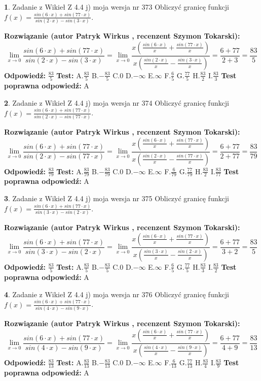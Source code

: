 \documentclass[12pt, a4paper]{article}
\theoremstyle{definition} %
\newtheorem{zad}{}
\newcommand{\zadStart}[1]{\begin{zad}#1\newline}
\newcommand{\zadStop}{\end{zad}}
\newcommand{\rozwStart}[2]{\noindent \textbf{Rozwiązanie (autor #1 , recenzent #2): }\newline}
\newcommand{\rozwStop}{\newline}
\newcommand{\odpStart}{\noindent \textbf{Odpowiedź:}\newline}
\newcommand{\odpStop}{\newline}
\newcommand{\testStart}{\noindent \textbf{Test:}\newline}
\newcommand{\testStop}{\newline}
\newcommand{\kluczStart}{\noindent \textbf{Test poprawna odpowiedź:}\newline}
\newcommand{\kluczStop}{\newline}
\begin{document}
\zadStart{Zadanie z Wikieł Z 4.4 j) moja wersja nr 373}
Obliczyć granicę funkcji $f(x)=\frac{sin(6\cdot x) +sin(77\cdot x)}{sin(2\cdot x) -sin(3\cdot x)}$.
\zadStop
\rozwStart{Patryk Wirkus}{Szymon Tokarski}
$$\lim\limits_{x\to 0}\frac{sin(6\cdot x) +sin(77\cdot x)}{sin(2\cdot x) -sin(3\cdot x)}=\lim\limits_{x\to 0}\frac{x(\frac{sin(6\cdot x)}{x}+\frac{sin(77\cdot x)}{x})}{x(\frac{sin(2\cdot x)}{x}-\frac{sin(3\cdot x)}{x})}=\frac{6+77}{2+3} = \frac{83}{5}$$
\rozwStop
\odpStart
$\frac{83}{5}$
\odpStop
\testStart
A.$\frac{83}{5}$
B.$-\frac{83}{5}$
C.$0$
D.$-\infty$
E.$\infty$
F.$\frac{6}{5}$
G.$\frac{77}{5}$
H.$\frac{83}{2}$
I.$\frac{83}{3}$
\testStop
\kluczStart
A
\kluczStop



\zadStart{Zadanie z Wikieł Z 4.4 j) moja wersja nr 374}
Obliczyć granicę funkcji $f(x)=\frac{sin(6\cdot x) +sin(77\cdot x)}{sin(2\cdot x) -sin(77\cdot x)}$.
\zadStop
\rozwStart{Patryk Wirkus}{Szymon Tokarski}
$$\lim\limits_{x\to 0}\frac{sin(6\cdot x) +sin(77\cdot x)}{sin(2\cdot x) -sin(77\cdot x)}=\lim\limits_{x\to 0}\frac{x(\frac{sin(6\cdot x)}{x}+\frac{sin(77\cdot x)}{x})}{x(\frac{sin(2\cdot x)}{x}-\frac{sin(77\cdot x)}{x})}=\frac{6+77}{2+77} = \frac{83}{79}$$
\rozwStop
\odpStart
$\frac{83}{79}$
\odpStop
\testStart
A.$\frac{83}{79}$
B.$-\frac{83}{79}$
C.$0$
D.$-\infty$
E.$\infty$
F.$\frac{6}{79}$
G.$\frac{77}{79}$
H.$\frac{83}{2}$
I.$\frac{83}{77}$
\testStop
\kluczStart
A
\kluczStop



\zadStart{Zadanie z Wikieł Z 4.4 j) moja wersja nr 375}
Obliczyć granicę funkcji $f(x)=\frac{sin(6\cdot x) +sin(77\cdot x)}{sin(3\cdot x) -sin(2\cdot x)}$.
\zadStop
\rozwStart{Patryk Wirkus}{Szymon Tokarski}
$$\lim\limits_{x\to 0}\frac{sin(6\cdot x) +sin(77\cdot x)}{sin(3\cdot x) -sin(2\cdot x)}=\lim\limits_{x\to 0}\frac{x(\frac{sin(6\cdot x)}{x}+\frac{sin(77\cdot x)}{x})}{x(\frac{sin(3\cdot x)}{x}-\frac{sin(2\cdot x)}{x})}=\frac{6+77}{3+2} = \frac{83}{5}$$
\rozwStop
\odpStart
$\frac{83}{5}$
\odpStop
\testStart
A.$\frac{83}{5}$
B.$-\frac{83}{5}$
C.$0$
D.$-\infty$
E.$\infty$
F.$\frac{6}{5}$
G.$\frac{77}{5}$
H.$\frac{83}{3}$
I.$\frac{83}{2}$
\testStop
\kluczStart
A
\kluczStop



\zadStart{Zadanie z Wikieł Z 4.4 j) moja wersja nr 376}
Obliczyć granicę funkcji $f(x)=\frac{sin(6\cdot x) +sin(77\cdot x)}{sin(4\cdot x) -sin(9\cdot x)}$.
\zadStop
\rozwStart{Patryk Wirkus}{Szymon Tokarski}
$$\lim\limits_{x\to 0}\frac{sin(6\cdot x) +sin(77\cdot x)}{sin(4\cdot x) -sin(9\cdot x)}=\lim\limits_{x\to 0}\frac{x(\frac{sin(6\cdot x)}{x}+\frac{sin(77\cdot x)}{x})}{x(\frac{sin(4\cdot x)}{x}-\frac{sin(9\cdot x)}{x})}=\frac{6+77}{4+9} = \frac{83}{13}$$
\rozwStop
\odpStart
$\frac{83}{13}$
\odpStop
\testStart
A.$\frac{83}{13}$
B.$-\frac{83}{13}$
C.$0$
D.$-\infty$
E.$\infty$
F.$\frac{6}{13}$
G.$\frac{77}{13}$
H.$\frac{83}{4}$
I.$\frac{83}{9}$
\testStop
\kluczStart
A
\kluczStop
\end{document}
